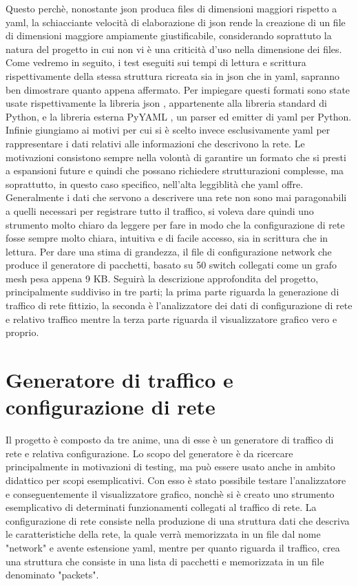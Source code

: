 \documentclass[binding=0.6cm]{sapthesis}
\begin{document}
Questo perchè, nonostante json produca files di dimensioni maggiori rispetto a yaml, la schiacciante velocità di elaborazione di json rende la creazione di
un file di dimensioni maggiore ampiamente giustificabile, considerando soprattuto la natura del progetto in cui non vi è una
criticità d'uso nella dimensione dei files. Come vedremo in seguito, i test eseguiti sui tempi di lettura e scrittura rispettivamente della stessa struttura
ricreata sia in json che in yaml, sapranno ben
dimostrare quanto appena affermato. Per impiegare questi formati sono state usate rispettivamente la libreria json \cite{PythonJSONLibrary}, appartenente alla libreria standard di Python, e la
libreria esterna PyYAML \cite{PyYAMLDocumentation}, un parser ed emitter di yaml per Python.
Infinie giungiamo ai motivi per cui si è scelto invece esclusivamente yaml per rappresentare i 
dati relativi alle informazioni che descrivono la rete. Le motivazioni consistono sempre nella volontà
di garantire un formato che si presti a espansioni future e quindi che possano richiedere strutturazioni complesse, ma soprattutto,
in questo caso specifico, nell'alta leggiblità che yaml offre. Generalmente i dati che servono a descrivere una rete non sono mai paragonabili a quelli
necessari per registrare tutto il traffico, si voleva dare quindi uno strumento molto chiaro da leggere per fare in modo che la configurazione di rete
fosse sempre molto chiara, intuitiva e di facile accesso, sia in scrittura che in lettura. 
Per dare una stima di grandezza, il file
di configurazione network che produce il generatore di pacchetti, basato su 50 switch collegati come un grafo mesh pesa appena 9 KB.
Seguirà la descrizione approfondita del progetto, principalmente suddiviso in tre parti; la prima 
parte riguarda la generazione di traffico di rete fittizio, la seconda è l'analizzatore dei dati di configurazione di rete e relativo traffico mentre la terza
parte riguarda il visualizzatore grafico vero e proprio.

\chapter{Generatore di traffico e configurazione di rete}

Il progetto è composto da tre anime, una di esse è un generatore di traffico di rete e relativa configurazione.
Lo scopo del generatore è da ricercare principalmente in motivazioni di testing, ma può essere
 usato anche in ambito didattico per scopi
esemplicativi. Con esso è stato possibile testare l'analizzatore e conseguentemente il visualizzatore grafico, nonchè si è creato 
uno strumento esemplicativo di determinati funzionamenti collegati al traffico di rete.
La configurazione di rete consiste nella produzione di una struttura dati che descriva 
le caratteristiche della rete, la quale
verrà memorizzata in un file dal nome "network" e avente estensione yaml, mentre per quanto
riguarda il traffico, crea una struttura che consiste in una lista di pacchetti e memorizzata in un file denominato "packets".
\end{document}
